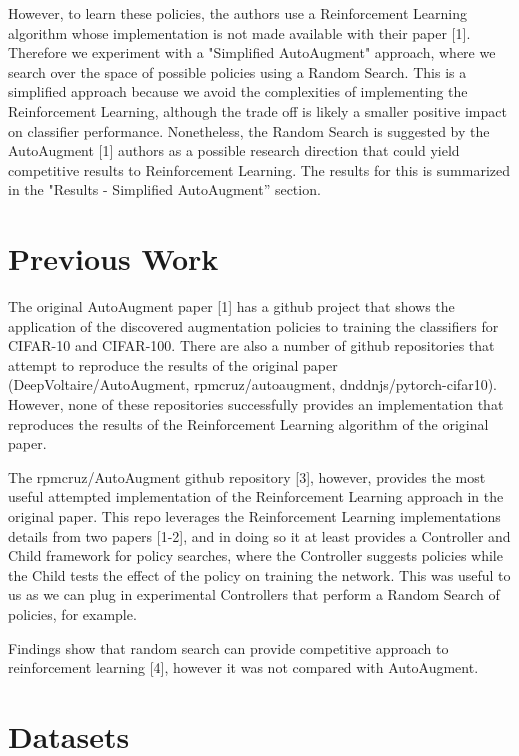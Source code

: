 \documentclass[10pt,twocolumn,letterpaper]{article}
\begin{document}
However, to learn these policies, the authors use a Reinforcement Learning algorithm whose implementation is not made available with their paper [1].  Therefore we experiment with a "Simplified AutoAugment" approach, where we search over the space of possible policies using a Random Search.  This is a simplified approach because we avoid the complexities of implementing the Reinforcement Learning, although the trade off is likely a smaller positive impact on classifier performance.  Nonetheless, the Random Search is suggested by the AutoAugment [1] authors as a possible research direction that could yield competitive results to Reinforcement Learning. The results for this is summarized in the "Results - Simplified AutoAugment” section.

\section{Previous Work}

The original AutoAugment paper [1] has a github project that shows the application of the discovered augmentation policies to training the classifiers for CIFAR-10 and CIFAR-100.  There are also a number of github repositories that attempt to reproduce the results of the original paper (DeepVoltaire/AutoAugment, rpmcruz/autoaugment, dnddnjs/pytorch-cifar10).  However, none of these repositories successfully provides an implementation that reproduces the results of the Reinforcement Learning algorithm of the original paper.

The rpmcruz/AutoAugment github repository [3], however, provides the most useful attempted implementation of the Reinforcement Learning approach in the original paper.  This repo leverages the Reinforcement Learning implementations details from two papers [1-2], and in doing so it at least provides a Controller and Child framework for policy searches, where the Controller suggests policies while the Child tests the effect of the policy on training the network.  This was useful to us as we can plug in experimental Controllers that perform a Random Search of policies, for example.

Findings show that random search can provide competitive approach to reinforcement learning [4], however it was not compared with AutoAugment.

\section{Datasets}
\end{document}
